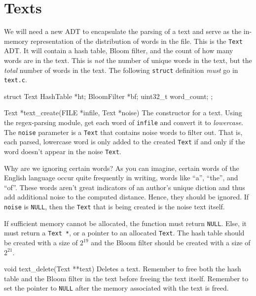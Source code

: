 \section{Texts}\label{sec:text}

We will need a new ADT to encapsulate the parsing of a text and serve as the
in-memory representation of the distribution of words in the file. This is the
\texttt{Text} ADT. It will contain a hash table, Bloom filter, and the count of
how many words are in the text. This is \emph{not} the number of unique words in
the text, but the \emph{total} number of words in the text. The following
\texttt{struct} definition \emph{must} go in \texttt{text.c}.

\begin{clisting}{}
struct Text {
  HashTable *ht;
  BloomFilter *bf;
  uint32_t word_count;
};
\end{clisting}

\begin{funcdoc}{Text *text\_create(FILE *infile, Text *noise)}
  The constructor for a text. Using the regex-parsing module, get each word of
  \texttt{infile} and convert it to \emph{lowercase}. The \texttt{noise}
  parameter is a \texttt{Text} that contains noise words to filter out. That is,
  each parsed, lowercase word is only added to the created \texttt{Text} if and
  only if the word doesn't appear in the noise \texttt{Text}.

  Why are we ignoring certain words? As you can imagine, certain
  words of the English language occur quite frequently in writing, words like
  ``a'', ``the'', and ``of''. These words aren't great indicators of an author's
  unique diction and thus add additional noise to the computed distance. Hence,
  they should be ignored. If \texttt{noise} is \texttt{NULL}, then the
  \texttt{Text} that is being created is the noise text itself.

  If sufficient memory cannot be allocated, the function must return
  \texttt{NULL}. Else, it must return a \texttt{Text *}, or a pointer to an
  allocated \texttt{Text}. The hash table should be created with a size of
  $2^{19}$ and the Bloom filter should be created with a size of $2^{21}$.
\end{funcdoc}

\begin{funcdoc}{void text\_delete(Text **text)}
  Deletes a text. Remember to free both the hash table and the Bloom filter in
  the text before freeing the text itself. Remember to set the pointer to
  \texttt{NULL} after the memory associated with the text is freed.
\end{funcdoc}

